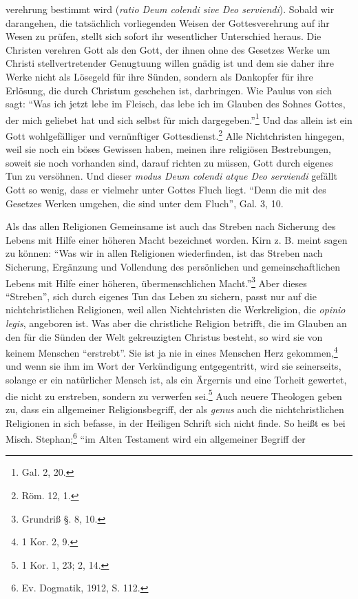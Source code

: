 verehrung bestimmt wird (\emph{ratio Deum colendi sive Deo serviendi}). Sobald wir darangehen, die tatsächlich vorliegenden Weisen der Gottesverehrung auf ihr Wesen zu prüfen, stellt sich sofort ihr wesentlicher Unterschied heraus. Die Christen verehren Gott als den Gott, der ihnen ohne des Gesetzes Werke um Christi stellvertretender Genugtuung willen gnädig ist und dem sie daher ihre Werke nicht als Lösegeld für ihre Sünden, sondern als Dankopfer für ihre Erlösung, die durch Christum geschehen ist, darbringen. Wie Paulus von sich sagt: ``Was ich jetzt lebe im Fleisch, das lebe ich im Glauben des Sohnes Gottes, der mich geliebet hat und sich selbst für mich dargegeben.''\footnote{Gal. 2, 20.} Und das allein ist ein Gott wohlgefälliger und vernünftiger Gottesdienst.\footnote{Röm. 12, 1.} Alle Nichtchristen hingegen, weil sie noch ein böses Gewissen haben, meinen ihre religiösen Bestrebungen, soweit sie noch vorhanden sind, darauf richten zu müssen, Gott durch eigenes Tun zu versöhnen. Und dieser \emph{modus Deum colendi atque Deo serviendi} gefällt Gott so wenig, dass er vielmehr unter Gottes Fluch liegt. ``Denn die mit des Gesetzes Werken umgehen, die sind unter dem Fluch'', Gal. 3, 10.

Als das allen Religionen Gemeinsame ist auch das Streben nach Sicherung des Lebens mit Hilfe einer höheren Macht bezeichnet worden. Kirn z. B. meint sagen zu können: ``Was wir in allen Religionen wiederfinden, ist das Streben nach Sicherung, Ergänzung und Vollendung des persönlichen und gemeinschaftlichen Lebens mit Hilfe einer höheren, übermenschlichen Macht.''\footnote{Grundriß §. 8, 10.} Aber dieses ``Streben'', sich durch eigenes Tun das Leben zu sichern, passt nur auf die nichtchristlichen Religionen, weil allen Nichtchristen die Werkreligion, die \emph{opinio legis}, angeboren ist. Was aber die christliche Religion betrifft, die im Glauben an den für die Sünden der Welt gekreuzigten Christus besteht, so wird sie von keinem Menschen ``erstrebt''. Sie ist ja nie in eines Menschen Herz gekommen,\footnote{1 Kor. 2, 9.} und wenn sie ihm im Wort der Verkündigung entgegentritt, wird sie seinerseits, solange er ein natürlicher Mensch ist, als ein Ärgernis und eine Torheit gewertet, die nicht zu erstreben, sondern zu verwerfen sei.\footnote{1 Kor. 1, 23; 2, 14.} Auch neuere Theologen geben zu, dass ein allgemeiner Religionsbegriff, der als \emph{genus} auch die nichtchristlichen Religionen in sich befasse, in der Heiligen Schrift sich nicht finde. So heißt es bei Misch. Stephan;\footnote{Ev. Dogmatik, 1912, S. 112.} ``im Alten Testament wird ein allgemeiner Begriff der